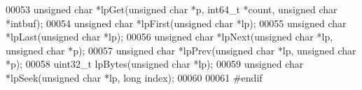 \begin{DoxyCode}
00053 \textcolor{keywordtype}{unsigned} \textcolor{keywordtype}{char} *lpGet(\textcolor{keywordtype}{unsigned} \textcolor{keywordtype}{char} *p, int64\_t *count, \textcolor{keywordtype}{unsigned} \textcolor{keywordtype}{char} *intbuf);
00054 \textcolor{keywordtype}{unsigned} \textcolor{keywordtype}{char} *lpFirst(\textcolor{keywordtype}{unsigned} \textcolor{keywordtype}{char} *lp);
00055 \textcolor{keywordtype}{unsigned} \textcolor{keywordtype}{char} *lpLast(\textcolor{keywordtype}{unsigned} \textcolor{keywordtype}{char} *lp);
00056 \textcolor{keywordtype}{unsigned} \textcolor{keywordtype}{char} *lpNext(\textcolor{keywordtype}{unsigned} \textcolor{keywordtype}{char} *lp, \textcolor{keywordtype}{unsigned} \textcolor{keywordtype}{char} *p);
00057 \textcolor{keywordtype}{unsigned} \textcolor{keywordtype}{char} *lpPrev(\textcolor{keywordtype}{unsigned} \textcolor{keywordtype}{char} *lp, \textcolor{keywordtype}{unsigned} \textcolor{keywordtype}{char} *p);
00058 uint32\_t lpBytes(\textcolor{keywordtype}{unsigned} \textcolor{keywordtype}{char} *lp);
00059 \textcolor{keywordtype}{unsigned} \textcolor{keywordtype}{char} *lpSeek(\textcolor{keywordtype}{unsigned} \textcolor{keywordtype}{char} *lp, \textcolor{keywordtype}{long} index);
00060 
00061 \textcolor{preprocessor}{#}\textcolor{preprocessor}{endif}
\end{DoxyCode}
